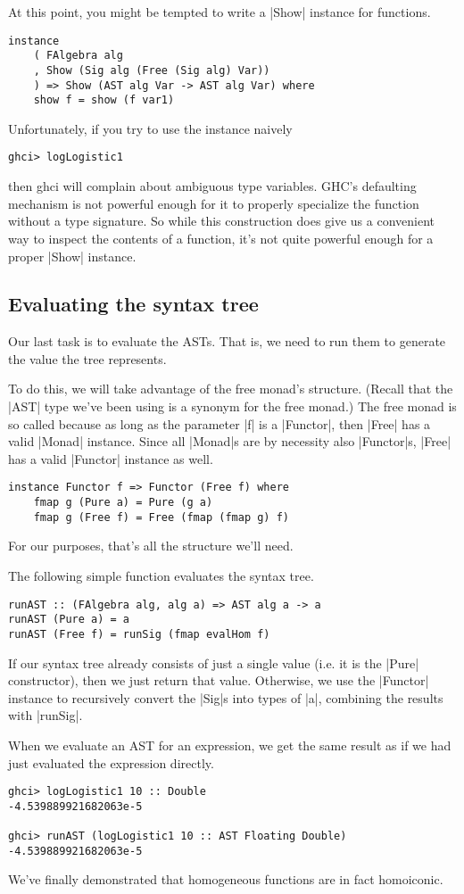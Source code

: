 \documentclass[preprint]{sigplanconf}
\theoremstyle{definition}
\begin{document}
At this point, you might be tempted to write a |Show| instance for functions.
\begin{lstlisting}
instance
    ( FAlgebra alg
    , Show (Sig alg (Free (Sig alg) Var))
    ) => Show (AST alg Var -> AST alg Var) where
    show f = show (f var1)
\end{lstlisting}
Unfortunately, if you try to use the instance naively
\begin{lstlisting}
ghci> logLogistic1
\end{lstlisting}
then ghci will complain about ambiguous type variables.
GHC's defaulting mechanism is not powerful enough for it to properly specialize the function without a type signature.
So while this construction does give us a convenient way to inspect the contents of a function,
it's not quite powerful enough for a proper |Show| instance.

\subsection{Evaluating the syntax tree}
Our last task is to evaluate the ASTs.
That is, we need to run them to generate the value the tree represents.

To do this, we will take advantage of the free monad's structure.
(Recall that the |AST| type we've been using is a synonym for the free monad.)
The free monad is so called because as long as the parameter |f| is a |Functor|,
then |Free| has a valid |Monad| instance.
Since all |Monad|s are by necessity also |Functor|s,
|Free| has a valid |Functor| instance as well.
\begin{lstlisting}
instance Functor f => Functor (Free f) where
    fmap g (Pure a) = Pure (g a)
    fmap g (Free f) = Free (fmap (fmap g) f)
\end{lstlisting}
For our purposes, that's all the structure we'll need.

The following simple function evaluates the syntax tree.
\begin{lstlisting}
runAST :: (FAlgebra alg, alg a) => AST alg a -> a
runAST (Pure a) = a
runAST (Free f) = runSig (fmap evalHom f)
\end{lstlisting}
If our syntax tree already consists of just a single value (i.e. it is the |Pure| constructor),
then we just return that value.
Otherwise, we use the |Functor| instance to recursively convert the |Sig|s into types of |a|,
combining the results with |runSig|.

When we evaluate an AST for an expression,
we get the same result as if we had just evaluated the expression directly.
\begin{lstlisting}
ghci> logLogistic1 10 :: Double
-4.539889921682063e-5

ghci> runAST (logLogistic1 10 :: AST Floating Double)
-4.539889921682063e-5
\end{lstlisting}
We've finally demonstrated that homogeneous functions are in fact homoiconic.
\end{document}
